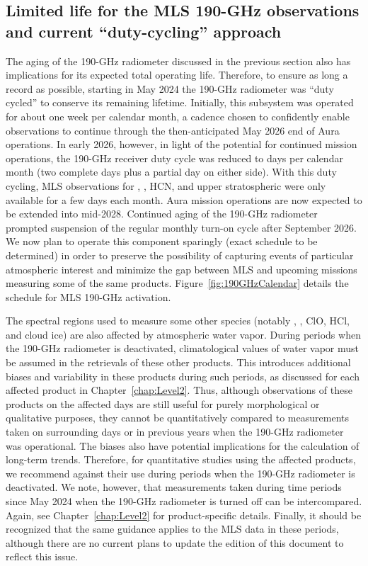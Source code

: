 \subsection{Limited life for the MLS 190-GHz observations and current ``duty-cycling'' approach}
\label{sec:R2DutyCycling}
The aging of the 190\nobreakdash-GHz radiometer discussed in the previous section also has implications for its expected total operating life. Therefore, to ensure as long a record as possible, starting in May 2024 the \mbox{190-GHz} radiometer was ``duty cycled'' to conserve its remaining lifetime. Initially, this subsystem was operated for about one week per calendar month, a cadence chosen to confidently enable observations to continue through the then-anticipated May 2026 end of Aura operations. In early 2026, however, in light of the potential for continued mission operations, the \mbox{190-GHz} receiver duty cycle was reduced to  days per calendar month (two complete days plus a partial day on either side). With this duty cycling, MLS observations for , , HCN, and upper stratospheric  were only available for a few days each month. Aura mission operations are now expected to be extended into mid-2028. Continued aging of the \mbox{190-GHz} radiometer prompted suspension of the regular monthly turn-on cycle after September 2026. We now plan to operate this component sparingly (exact schedule to be determined) in order to preserve the possibility of capturing events of particular atmospheric interest and minimize the gap between MLS and upcoming missions measuring some of the same products. Figure~\ref{fig:190GHzCalendar} details the schedule for MLS 190\nobreakdash-GHz activation. 

The spectral regions used to measure some other species (notably , , ClO, HCl, and cloud ice) are also affected by atmospheric water vapor.  During periods when the 190\nobreakdash-GHz radiometer is deactivated, climatological values of water vapor must be assumed in the retrievals of these other products.  This introduces additional biases and variability in these products during such periods, as discussed for each affected product in Chapter~\ref{chap:Level2}.  Thus, although observations of these products on the affected days are still useful for purely morphological or qualitative purposes, they cannot be quantitatively compared to measurements taken on surrounding days or in previous years when the \mbox{190-GHz} radiometer was operational. The biases also have potential implications for the calculation of long-term trends. Therefore, for quantitative studies using the affected products, we recommend against their use during periods when the \mbox{190-GHz} radiometer is deactivated.  We note, however, that measurements taken during time periods since May 2024 when the \mbox{190-GHz} radiometer is turned off can be intercompared.  Again, see Chapter~\ref{chap:Level2} for product-specific details.  Finally, it should be recognized that the same guidance applies to the MLS \vv data in these periods, although there are no current plans to update the \vv edition of this document \citep{EOSMLSV5Quality} to reflect this issue.

